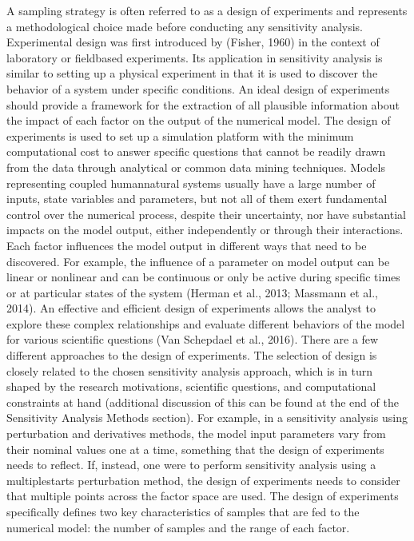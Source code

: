 \documentclass[letterpaper,10pt,english]{sphinxmanual}
\begin{document}
A sampling strategy is often referred to as a design of experiments and represents a methodological choice made before conducting any sensitivity analysis. Experimental design was first introduced by (Fisher, 1960) in the context of laboratory or field\sphinxhyphen{}based experiments. Its application in sensitivity analysis is similar to setting up a physical experiment in that it is used to discover the behavior of a system under specific conditions. An ideal design of experiments should provide a framework for the extraction of all plausible information about the impact of each factor on the output of the numerical model. The design of experiments is used to set up a simulation platform with the minimum computational cost to answer specific questions that cannot be readily drawn from the data through analytical or common data mining techniques. Models representing coupled human\sphinxhyphen{}natural systems usually have a large number of inputs, state variables and parameters, but not all of them exert fundamental control over the numerical process, despite their uncertainty, nor have substantial impacts on the model output, either independently or through their interactions. Each factor influences the model output in different ways that need to be discovered. For example, the influence of a parameter on model output can be linear or non\sphinxhyphen{}linear and can be continuous or only be active during specific times or at particular states of the system (Herman et al., 2013; Massmann et al., 2014). An effective and efficient design of experiments allows the analyst to explore these complex relationships and evaluate different behaviors of the model for various scientific questions (Van Schepdael et al., 2016).
There are a few different approaches to the design of experiments. The selection of design is closely related to the chosen sensitivity analysis approach, which is in turn shaped by the research motivations, scientific questions, and computational constraints at hand (additional discussion of this can be found at the end of the Sensitivity Analysis Methods section). For example, in a sensitivity analysis using perturbation and derivatives methods, the model input parameters vary from their nominal values one at a time, something that the design of experiments needs to reflect. If, instead, one were to perform sensitivity analysis using a multiple\sphinxhyphen{}starts perturbation method, the design of experiments needs to consider that multiple points across the factor space are used. The design of experiments specifically defines two key characteristics of samples that are fed to the numerical model: the number of samples and the range of each factor.
\end{document}
